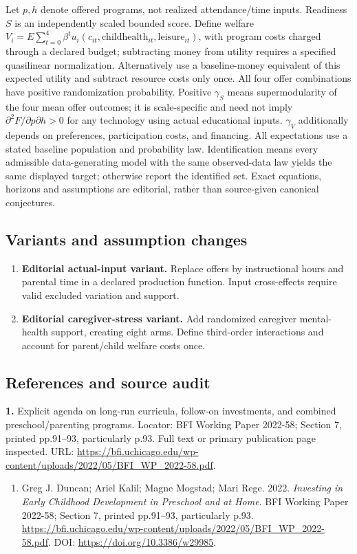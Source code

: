 \documentclass[11pt,a4paper]{article}
\begin{document}
Let \(p,h\) denote offered programs, not realized attendance/time inputs. Readiness \(S\) is an independently scaled bounded score. Define welfare \(V_i=E\sum_{t=0}^{4}\beta^tu_i(c_{it},\text{childhealth}_{it},\text{leisure}_{it})\), with program costs charged through a declared budget; subtracting money from utility requires a specified quasilinear normalization. Alternatively use a baseline-money equivalent of this expected utility and subtract resource costs only once. All four offer combinations have positive randomization probability. Positive \(\gamma_S\) means supermodularity of the four mean offer outcomes; it is scale-specific and need not imply \(\partial^2F/\partial p\partial h>0\) for any technology using actual educational inputs. \(\gamma_V\) additionally depends on preferences, participation costs, and financing. All expectations use a stated baseline population and probability law. Identification means every admissible data-generating model with the same observed-data law yields the same displayed target; otherwise report the identified set. Exact equations, horizons and assumptions are editorial, rather than source-given canonical conjectures.
\subsection*{Variants and assumption changes}
\begin{enumerate}
\item \textbf{Editorial actual-input variant.} Replace offers by instructional hours and parental time in a declared production function. Input cross-effects require valid excluded variation and support.
\item \textbf{Editorial caregiver-stress variant.} Add randomized caregiver mental-health support, creating eight arms. Define third-order interactions and account for parent/child welfare costs once.
\end{enumerate}
\subsection*{References and source audit}
\textbf{1.} Explicit agenda on long-run curricula, follow-on investments, and combined preschool/parenting programs. Locator: BFI Working Paper 2022-58; Section 7, printed pp.91–93, particularly p.93. Full text or primary publication page inspected. URL: \url{https://bfi.uchicago.edu/wp-content/uploads/2022/05/BFI_WP_2022-58.pdf}.
\begin{enumerate}\raggedright
\item\hypertarget{definitions:source:30007733:1}{} Greg J. Duncan; Ariel Kalil; Magne Mogstad; Mari Rege. 2022. \emph{Investing in Early Childhood Development in Preschool and at Home}. BFI Working Paper 2022-58; Section 7, printed pp.91–93, particularly p.93.
\url{https://bfi.uchicago.edu/wp-content/uploads/2022/05/BFI_WP_2022-58.pdf}.
DOI: \url{https://doi.org/10.3386/w29985}.
\end{enumerate}
\end{document}

